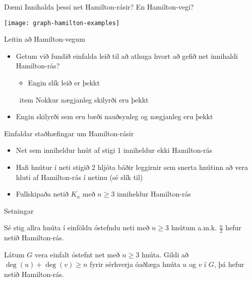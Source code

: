 \documentclass[handout]{beamer}
\begin{document}
\begin{frame}{Dæmi}
Innihalda þessi net Hamilton-rásir? En Hamilton-vegi?
\begin{center}
\texttt{[image: graph-hamilton-examples]}
\end{center}

\end{frame}


\begin{frame}{Leitin að Hamilton-vegum}
\begin{itemize}
 \item Getum við fundið einfalda leið til að athuga hvort að gefið net innihaldi Hamilton-rás? \pause
 \begin{itemize}
  \item Engin slík leið er þekkt
 \end{itemize}
\ item Nokkur nægjanleg skilyrði eru þekkt
 \item Engin skilyrði sem eru bæði nauðsynleg og nægjanleg eru þekkt
\end{itemize}
\end{frame}

\begin{frame}{Einfaldar staðhæfingar um Hamilton-rásir}
\begin{itemize}[<+->]
 \item Net sem inniheldur hnút af stigi 1 inniheldur ekki Hamilton-rás
 \item Hafi hnútur í neti stigið 2 hljóta báðir leggirnir sem snerta hnútinn að vera hluti af Hamilton-rás í netinu (sé slík til)
 \item Fullskipaða netið $K_n$ með $n \geq 3$ inniheldur Hamilton-rás
\end{itemize}
\end{frame}

\begin{frame}{Setningar}
\begin{tcolorbox}[title=Setning Diracs]
Sé stig allra hnúta í einföldu óstefndu neti með $n \geq 3$ hnútum a.m.k. $\frac{n}{2}$ hefur netið Hamilton-rás.
\end{tcolorbox}
\begin{tcolorbox}[title=Setning Ores]
Látum $G$ vera einfalt óstefnt net með $n \geq 3$ hnúta. Gildi að $\deg(u) + \deg(v) \geq n$ fyrir sérhverja óaðlæga hnúta $u$ og $v$ í $G$, þá hefur netið Hamilton-rás.
\end{tcolorbox}
\end{frame}
\end{document}
